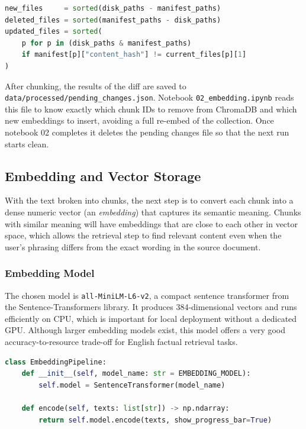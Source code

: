 \begin{lstlisting}[language=Python]
new_files     = sorted(disk_paths - manifest_paths)
deleted_files = sorted(manifest_paths - disk_paths)
updated_files = sorted(
    p for p in (disk_paths & manifest_paths)
    if manifest[p]["content_hash"] != current_files[p][1]
)
\end{lstlisting}

After chunking, the results of the diff are saved to \texttt{data/processed/pending\_changes.json}. Notebook \texttt{02\_embedding.ipynb} reads this file to know exactly which chunk IDs to remove from ChromaDB and which new embeddings to insert, avoiding a full re-embed of the collection. Once notebook 02 completes it deletes the pending changes file so that the next run starts clean.

\subsection{Embedding and Vector Storage}
\label{sec:impl-embedding}

With the text broken into chunks, the next step is to convert each chunk into a dense numeric vector (an \emph{embedding}) that captures its semantic meaning. Chunks with similar meaning will have embeddings that are close to each other in vector space, which allows the retrieval step to find relevant content even when the user's phrasing differs from the exact wording in the source document.

\subsubsection{Embedding Model}

The chosen model is \texttt{all-MiniLM-L6-v2}, a compact sentence transformer from the Sentence-Transformers library. It produces 384-dimensional vectors and runs efficiently on CPU, which is important for local deployment without a dedicated GPU. Although larger embedding models exist, this model offers a very good accuracy-to-resource trade-off for English factual retrieval tasks.

\begin{lstlisting}[language=Python]
class EmbeddingPipeline:
    def __init__(self, model_name: str = EMBEDDING_MODEL):
        self.model = SentenceTransformer(model_name)

    def encode(self, texts: list[str]) -> np.ndarray:
        return self.model.encode(texts, show_progress_bar=True)
\end{lstlisting}

